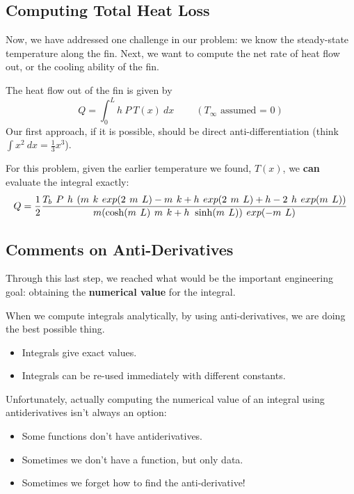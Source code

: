 \newpage


\subsection*{Computing Total Heat Loss}
Now, we have addressed one challenge in our problem: we know the
steady-state temperature along the fin.  Next, we want to compute
the net rate of heat flow out, or the cooling ability of the fin.

The heat flow out of the fin is given by
$$
Q = \int_0^{L} h ~P ~T(x) ~dx   ~~~~~~~~~~ (T_\infty \mbox{ assumed = 0})
$$
Our first approach, if it is possible, should be direct
anti-differentiation (think $\int x^2 ~dx = \frac{1}{3}x^3$).

For this problem, given the earlier temperature we found, $T(x)$, we
{\bf can} evaluate the integral exactly:
$$ \large
Q =
\frac{1}{2}\frac{T_b~P~h~(m~k~exp(2~m~L)-m~k+h~exp(2~m~L)+h-2~h~exp(m~L))}{m(\cosh(m~L)~m~k+h~\sinh(m~L))~exp(-m~L)}
$$
 


\newpage

\subsection*{Comments on Anti-Derivatives}

Through this last step, we reached what would be the important
engineering goal: obtaining the {\bf numerical value} for the
integral.

When we compute integrals analytically, by using anti-derivatives, we
are doing the best possible thing. 
\begin{itemize}
\item Integrals give exact values.
\item Integrals can be re-used immediately with different constants.
\end{itemize}
Unfortunately, actually computing the numerical value of an integral
using antiderivatives isn't always an option:
\begin{itemize}
\item Some functions don't have antiderivatives.  
\vspace{1cm}
\item Sometimes we don't have a function, but only data.
\vspace{1cm}
\item Sometimes we forget how to find the anti-derivative!
\vspace{1cm}
\end{itemize}

